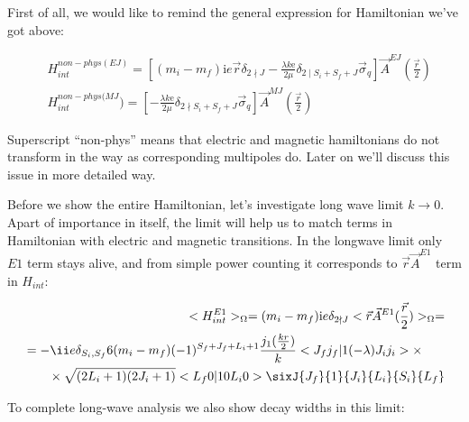 First of all, we would like to remind the general expression for Hamiltonian we've got above:

\begin{align}
    &H_{int}^{non-phys (EJ)} = \left[(m_i - m_f) \mathrm{i} e \vec{r} \delta_{2 \nmid J} - \frac{\lambda k \mathrm{e}}{2 \mu} \delta_{2 \mid S_i + S_f + J} \vec{\sigma}_{q} \right] \vec{A}^{EJ}(\frac{\vec{r}}{2}) \\
    &H_{int}^{non-phys (MJ}) = \left[ -\frac{\lambda k \mathrm{e}}{2 \mu} \delta_{2 \nmid S_i + S_f + J} \vec{\sigma}_{q} \right] \vec{A}^{MJ}(\frac{\vec{r}}{2})
\end{align}

Superscript ``non-phys'' means that electric and magnetic hamiltonians do not transform in the way as corresponding multipoles do. Later on we'll discuss this issue in more detailed way.

Before we show the entire Hamiltonian, let's investigate long wave limit $k \rightarrow 0$. Apart of importance in itself, the limit will help us to match terms in Hamiltonian with electric and magnetic transitions. In the longwave limit only $E1$ term stays alive, and from simple power counting it corresponds to $\vec{r}\vec{A}^{E1}$ term in $H_{int}$:

\begin{align}
    \begin{split}
        <H_{int}^{E1}>_{\Omega} = (m_i-m_f)\mathrm{i}e\delta_{2 \nmid J} <\vec{r}\vec{A}^{E1}(\frac{\vec{r}}{2})>_{\Omega} =
    \end{split}\\
    \begin{split}
        &= -\ii e \delta_{S_i, S_f} 6 (m_i-m_f) (-1)^{S_f + J_f + L_i + 1} \frac{j_1(\frac{k r}{2})}{k} <J_f j_f | 1 (-\lambda) J_i j_i> \times \\
        &\qquad\times \sqrt{(2L_i+1)(2J_i+1)} <L_f 0 | 1 0 L_i 0> \sixJ{J_f}{1}{J_i}{L_i}{S_{i}}{L_f}
    \end{split}
\end{align}

To complete long-wave analysis we also show decay widths in this limit:

